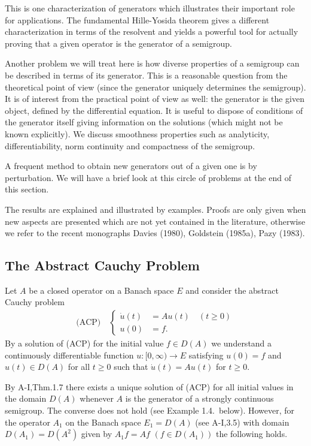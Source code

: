 This is one characterization of generators which illustrates their important role for applications.
The fundamental Hille-Yosida theorem gives a different characterization in terms of the resolvent and yields a powerful tool for actually proving that a given operator is the generator of a semigroup.

Another problem we will treat here is how diverse properties of a semigroup can be described in terms of its generator.
This is a reasonable question from the theoretical point of view (since the generator uniquely determines the semigroup).
It is of interest from the practical point of view as well: the generator is the given object, defined by the differential equation.
It is useful to dispose of conditions of the generator itself giving information on the solutions (which might not be known explicitly).
We discuss smoothness properties such as analyticity, differentiability, norm continuity and compactness of the semigroup.

A frequent method to obtain new generators out of a given one is by perturbation.
We will have a brief look at this circle of problems at the end of this section.

The results are explained and illustrated by examples.
Proofs are only given when new aspects are presented which are not yet contained in the literature, otherwise we refer to the recent monographs Davies (1980), Goldstein (1985a), Pazy (1983).


\subsection{The Abstract Cauchy Problem}\label{sec:acp}

Let $A$ be a closed operator on a Banach space $E$ and consider the abstract Cauchy problem
\[
\begin{aligned}
\text{(ACP)} \quad \begin{cases}
\dot{u}(t) &= Au(t) \quad (t \geq 0) \\
u(0) &= f.
\end{cases}
\end{aligned}
\]
By a solution of (ACP) for the initial value $f \in D(A)$ we understand a continuously differentiable function $u : [0,\infty) \to E$ satisfying $u(0) = f$ and $u(t) \in D(A)$ for all $t \geq 0$ such that $\dot{u}(t) = Au(t)$ for $t \geq 0$.

By A-I,Thm.1.7 there exists a unique solution of (ACP) for all initial values in the domain $D(A)$ whenever $A$ is the generator of a strongly continuous semigroup.
The converse does not hold (see Example 1.4.\ below).
However, for the operator $A_{1}$ on the Banach space $E_{1} = D(A)$ (see A-I,3.5) with domain $D(A_{1}) = D(A^{2})$ given by $A_{1}f = Af$ $(f \in D(A_{1}))$ the following holds.

